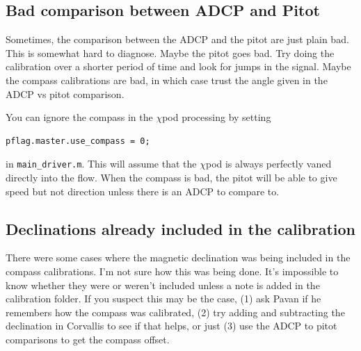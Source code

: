 \subsection{Bad comparison between ADCP and Pitot}
Sometimes, the comparison between the ADCP and the pitot are just plain bad. This is somewhat hard to diagnose. Maybe the pitot goes bad. Try doing the calibration over a shorter period of time and look for jumps in the signal. Maybe the compass calibrations are bad, in which case trust the angle given in the ADCP vs pitot comparison.

You can ignore the compass in the $\chi$pod processing by setting
\begin{verbatim}
pflag.master.use_compass = 0;
\end{verbatim}
in \texttt{main\_driver.m}. This will assume that the $\chi$pod is always perfectly vaned directly into the flow. When the compass is bad, the pitot will be able to give speed but not direction unless there is an ADCP to compare to.

\subsection{Declinations already included in the calibration}

There were some cases where the magnetic declination was being included in the compass calibrations. I'm not sure how this was being done. It's impossible to know whether they were or weren't included unless a note is added in the calibration folder. If you suspect this may be the case, (1) ask Pavan if he remembers how the compass was calibrated, (2) try adding and subtracting the declination in Corvallis to see if that helps, or just (3) use the ADCP to pitot comparisons to get the compass offset.

